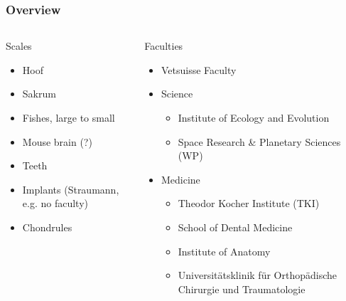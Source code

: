 \documentclass[aspectratio=169]{beamer}
\begin{document}
\begin{frame}
	\frametitle{Overview}
	\begin{columns}
		\begin{column}{0.309\linewidth}
			Scales
			\begin{itemize}
				\item Hoof
				\item Sakrum
				\item Fishes, large to small	
				\item Mouse brain (?)
				\item Teeth
				\item Implants (Straumann, e.g. no faculty)
				\item Chondrules
			\end{itemize}
		\end{column}
		\begin{column}{0.618\linewidth}
			Faculties
			\begin{itemize}
				\item Vetsuisse Faculty
				\item Science
				\begin{itemize}
					\item Institute of Ecology and Evolution
					\item Space Research \& Planetary Sciences (WP)
				\end{itemize}	
				\item Medicine
				\begin{itemize}
					\item Theodor Kocher Institute (TKI)
					\item School of Dental Medicine
					\item Institute of Anatomy
					\item Universitätsklinik für Orthopädische Chirurgie und Traumatologie
				\end{itemize}
			\end{itemize}
		\end{column}
	\end{columns}
\end{frame}
\end{document}
